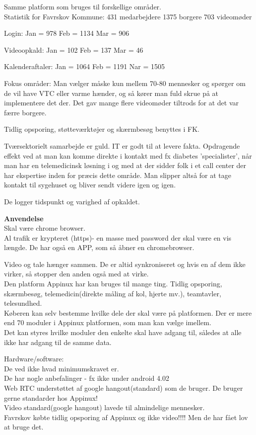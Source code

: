 Samme platform som bruges til forskellige områder.\\

Statistik for Favrskov Kommune:
431 medarbejdere
1375 borgere
703 videomøder

Login:
Jan = 978
Feb = 1134
Mar = 906

Videoopkald:
Jan = 102
Feb = 137
Mar = 46

Kalenderaftaler:
Jan = 1064
Feb = 1191
Nar = 1505

Fokus områder:
Man vælger måske kun mellem 70-80 mennesker og spørger om de vil have VTC eller varme hænder, og så kører man fuld skrue på at implementere det der. Det gav mange flere videomøder tiltrods for at det var færre borgere.

Tidlig opsporing, støtteværktøjer og skærmbesøg benyttes i FK. 

Tværsektorielt samarbejde er guld. IT er godt til at levere fakta.
Opdragende effekt ved at man kan komme direkte i kontakt med fx diabetes 'specialister', når man har en telemedicinsk løsning i og med at der sidder folk i et call center der har ekspertise inden for præcis dette område. 
Man slipper altså for at tage kontakt til sygehuset og bliver sendt videre igen og igen.

De logger tidspunkt og varighed af opkaldet.

\textbf{Anvendelse} 
\\
Skal være chrome browser.\\
Al trafik er krypteret (https)- en masse med password der skal være en vis længde. 
De har også en APP, som så åbner en chromebrowser. 

Video og tale hænger sammen. De er altid synkroniseret og hvis en af dem ikke virker, så stopper den anden også med at virke. \\
Den platform Appinux har kan bruges til mange ting. Tidlig opsporing, skærmbesøg, telemedicin(direkte måling af kol, hjerte mv.), teamtavler, telesundhed.\\
Køberen kan selv bestemme hvilke dele der skal være på platformen. 
Der er mere end 70 moduler i Appinux platformen, som man kan vælge imellem.\\
Det kan styres hvilke moduler den enkelte skal have adgang til, således at alle ikke har adgang til de samme data.

Hardware/software: \\
De ved ikke hvad minimumskravet er.\\
De har nogle anbefalinger - fx ikke under android 4.02 \\
Web RTC understøttet af google hangout(standard) som de bruger. De bruger gerne standarder hos Appinux!\\
Video standard(google hangout) lavede til almindelige mennesker. \\
Favrskov købte tidlig opsporing af Appinux og ikke video!!!!
Men de har fået lov at bruge det.

